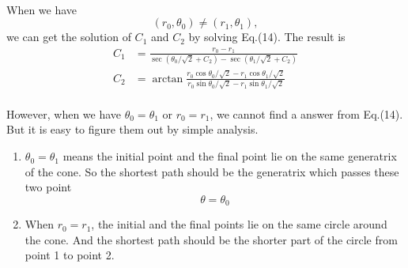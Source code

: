 \documentclass[%
 reprint,
 amsmath,amssymb,
 aps,
]{revtex4-1}
\begin{document}
\paragraph{}When we have
\begin{equation}
    (r_0,\theta_0)\neq(r_1,\theta_1),
\end{equation}
we can get the solution of $C_1$ and $C_2$ by solving Eq.(14). The result is
\begin{equation}
\begin{aligned}
C_1&=\frac{r_0-r_1}{\sec{(\theta_0/\sqrt{2}+C_2)}-\sec{(\theta_1/\sqrt{2}+C_2)}}\\
C_2&=\arctan{\frac{r_0\cos{\theta_0/\sqrt{2}}-r_1\cos{\theta_1/\sqrt{2}}}{r_0\sin{\theta_0/\sqrt{2}}-r_1\sin{\theta_1/\sqrt{2}}}}
\end{aligned}
\end{equation}
\paragraph{} However, when we have $\theta_0=\theta_1$ or $r_0=r_1$, we cannot find a answer from Eq.(14). But it is easy to figure them out by simple analysis.
\begin{enumerate}
    \item $\theta_0=\theta_1$ means the initial point and the final point lie on the same generatrix of the cone. So the shortest path should be the generatrix which passes these two point
    \begin{equation}
        \theta=\theta_0
    \end{equation}
    \item When $r_0=r_1$, the initial and the final points lie on the same circle around the cone. And the shortest path should be the shorter part of the circle from point 1 to point 2.
\end{enumerate}
\end{document}
